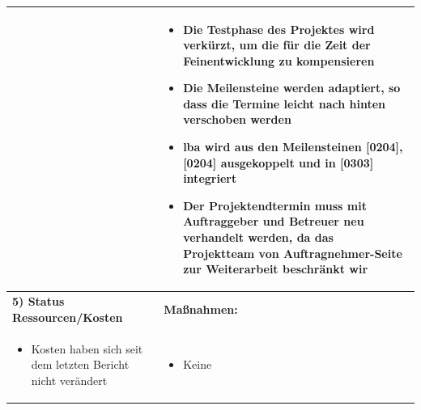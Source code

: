 \begin{center}
\begin{scriptsize}
\begin{tabularx}{\textwidth}{|p{8cm}|X|}
\begin{minipage}{.56\textwidth}
\begin{flushleft}
    \end{flushleft}
    \end{minipage} &
    \begin{minipage}{.4\textwidth} 
    \begin{flushleft}
        \begin{itemize} \vspace{0cm}  
         \item Die Testphase des Projektes wird verkürzt, um die für die Zeit der Feinentwicklung zu kompensieren
         \item Die Meilensteine werden adaptiert, so dass die Termine leicht nach hinten verschoben werden
         \item \gls{lba} wird aus den Meilensteinen [0204], [0204] ausgekoppelt und in [0303] integriert
         \item Der Projektendtermin muss mit Auftraggeber und Betreuer neu verhandelt werden, da das Projektteam von Auftragnehmer-Seite zur Weiterarbeit beschränkt wir
         \vspace{0.2cm}
    \end{itemize}
    \end{flushleft}
    \end{minipage} \\
    \hline
    \textbf{5) Status Ressourcen/Kosten} & \textbf{Maßnahmen:}\\
    \begin{minipage}{.58\textwidth} 
    \begin{flushleft}
        \begin{itemize} \vspace{0cm}  
         \item Kosten haben sich seit dem letzten Bericht nicht verändert
         \vspace{0.2cm}
    \end{itemize}
    \end{flushleft}
    \end{minipage} &
    \begin{minipage}{.4\textwidth} 
    \begin{flushleft}
        \begin{itemize} %
         \item Keine
         \vspace{0.2cm}
    \end{itemize}
    \end{flushleft}
    \end{minipage} \\

\end{tabularx}
\end{scriptsize}
\end{center}

